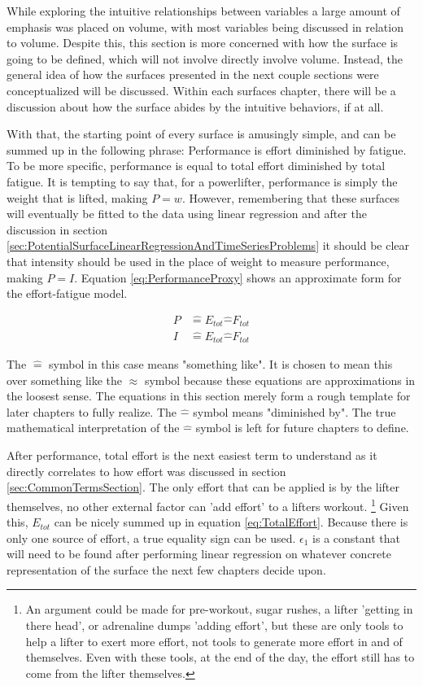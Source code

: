 While exploring the intuitive relationships between variables a large amount of emphasis was placed on volume, with most variables being discussed in relation to volume. Despite this, this section is more concerned with how the surface is going to be defined, which will not involve directly involve volume. Instead, the general idea of how the surfaces presented in the next couple sections were conceptualized will be discussed. Within each surfaces chapter, there will be a discussion about how the surface abides by the intuitive behaviors, if at all.

With that, the starting point of every surface is amusingly simple, and can be summed up in the following phrase: Performance is effort diminished by fatigue. To be more specific, performance is equal to total effort diminished by total fatigue. It is tempting to say that, for a powerlifter, performance is simply the weight that is lifted, making $P=w$. However, remembering that these surfaces will eventually be fitted to the data using linear regression and after the discussion in section \ref{sec:PotentialSurfaceLinearRegressionAndTimeSeriesProblems} it should be clear that intensity should be used in the place of weight to measure performance, making $P=I$. Equation \ref{eq:PerformanceProxy} shows an approximate form for the effort-fatigue model.

\begin{equation}
	\label{eq:PerformanceProxy}
	\begin{split}
			P &\hat{=} E_{tot}\hat{-}F_{tot} \\
			I &\hat{=} E_{tot}\hat{-}F_{tot}
	\end{split}
\end{equation}

The $\hat{=}$ symbol in this case means "something like". It is chosen to mean this over something like the $\approx$ symbol because these equations are approximations in the loosest sense. The equations in this section merely form a rough template for later chapters to fully realize. The $\hat{-}$ symbol means "diminished by". The true mathematical interpretation of the $\hat{-}$ symbol is left for future chapters to define.

After performance, total effort is the next easiest term to understand as it directly correlates to how effort was discussed in section \ref{sec:CommonTermsSection}. The only effort that can be applied is by the lifter themselves, no other external factor can 'add effort' to a lifters workout. \footnote{An argument could be made for pre-workout, sugar rushes, a lifter 'getting in there head', or adrenaline dumps 'adding effort', but these are only tools to help a lifter to exert more effort, not tools to generate more effort in and of themselves. Even with these tools, at the end of the day, the effort still has to come from the lifter themselves.} Given this, $E_{tot}$ can be nicely summed up in equation \ref{eq:TotalEffort}. Because there is only one source of effort, a true equality sign can be used. $\epsilon_1$ is a constant that will need to be found after performing linear regression on whatever concrete representation of the surface the next few chapters decide upon.


